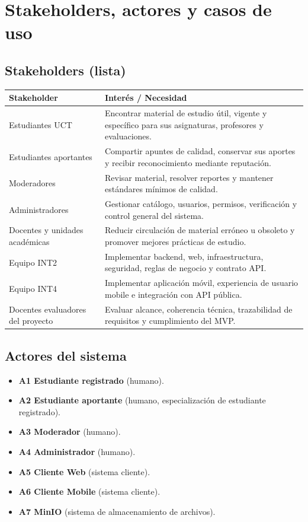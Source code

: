 \documentclass[12pt,a4paper]{article}
\begin{document}
\section{Stakeholders, actores y casos de uso}

\subsection{Stakeholders (lista)}

\begin{longtable}{p{} p{}}
\toprule
\textbf{Stakeholder} & \textbf{Interés / Necesidad}\\
\midrule
Estudiantes UCT & Encontrar material de estudio útil, vigente y específico para sus asignaturas, profesores y evaluaciones.\\
Estudiantes aportantes & Compartir apuntes de calidad, conservar sus aportes y recibir reconocimiento mediante reputación.\\
Moderadores & Revisar material, resolver reportes y mantener estándares mínimos de calidad.\\
Administradores & Gestionar catálogo, usuarios, permisos, verificación y control general del sistema.\\
Docentes y unidades académicas & Reducir circulación de material erróneo u obsoleto y promover mejores prácticas de estudio.\\
Equipo INT2 & Implementar backend, web, infraestructura, seguridad, reglas de negocio y contrato API.\\
Equipo INT4 & Implementar aplicación móvil, experiencia de usuario mobile e integración con API pública.\\
Docentes evaluadores del proyecto & Evaluar alcance, coherencia técnica, trazabilidad de requisitos y cumplimiento del MVP.\\
\bottomrule
\end{longtable}

\subsection{Actores del sistema}

\begin{itemize}
    \item \textbf{A1 Estudiante registrado} (humano).
    \item \textbf{A2 Estudiante aportante} (humano, especialización de estudiante registrado).
    \item \textbf{A3 Moderador} (humano).
    \item \textbf{A4 Administrador} (humano).
    \item \textbf{A5 Cliente Web} (sistema cliente).
    \item \textbf{A6 Cliente Mobile} (sistema cliente).
    \item \textbf{A7 MinIO} (sistema de almacenamiento de archivos).
\end{itemize}
\end{document}
